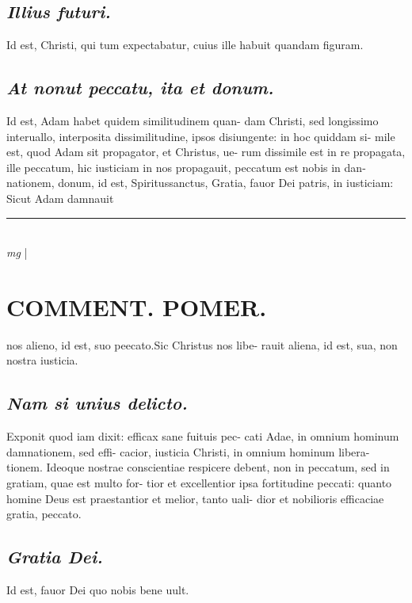 \documentclass{article}
\begin{document}
\begin{pages}
\subsection*{\textit{Illius futuri. }}\pstart Id est, Christi, qui tum expectabatur, cuius ille habuit quandam figuram.   \pend
{}
{}
\subsection*{\textit{At nonut peccatu, ita et donum. }}\pstart Id est, Adam habet quidem similitudinem quan- dam Christi, sed longissimo interuallo, interposita dissimilitudine, ipsos disiungente: in hoc quiddam si- mile est, quod Adam sit propagator, et Christus, ue- rum dissimile est in re propagata, ille peccatum, hic iusticiam in nos propagauit, peccatum est nobis in dan- nationem, donum, id est, Spiritussanctus, Gratia, fauor Dei patris, in iusticiam: Sicut Adam damnauit  \pend
\vspace{0.5cm}\noindent
\vspace{0.2cm}\rule{1cm}{0.2pt}\\ 
\hspace{0.2cm}\textit{mg}
\footnotesize 
\normalsize| 
\section*{COMMENT. POMER.  }\pstart nos alieno, id est, suo peecato.Sic Christus nos libe- rauit aliena, id est, sua, non nostra iusticia.   \pend
{}
{}
\subsection*{\textit{Nam si unius delicto. }}\pstart Exponit quod iam dixit: efficax sane fuituis pec- cati Adae, in omnium hominum damnationem, sed effi- cacior, iusticia Christi, in omnium hominum libera- tionem. Ideoque nostrae conscientiae respicere debent, non in peccatum, sed in gratiam, quae est multo for- tior et excellentior ipsa fortitudine peccati: quanto homine Deus est praestantior et melior, tanto uali- dior et nobilioris efficaciae gratia, peccato.   \pend
{}
{}
\subsection*{\textit{Gratia Dei. }}\pstart Id est, fauor Dei quo nobis bene uult.   \pend
{}
{}

\end{pages}
\end{document}
